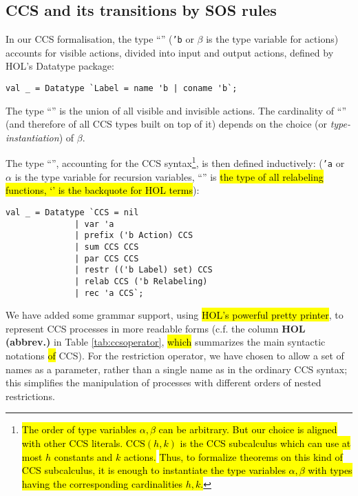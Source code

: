 
\subsection{CCS and its transitions by SOS rules}

In our CCS formalisation, the type ``'' (\texttt{'b} or
$\beta$ is the type variable for actions) accounts for visible actions, divided into input
and output actions, defined by HOL's Datatype package:
\begin{lstlisting}
val _ = Datatype `Label = name 'b | coname 'b`;
\end{lstlisting}
The type ``'' is the
union of all visible and invisible actions. The cardinality of
``'' (and therefore of all
CCS types built on top of it)
 depends on the choice (or \emph{type-instantiation}) of $\beta$.

The type ``'', accounting for the CCS
syntax\footnote{\hl{The order of type variables $\alpha, \beta$ can be
    arbitrary. But our choice is aligned with other CCS literals.
$\mathrm{CCS}(h,k)$ is the CCS subcalculus which can use at most $h$ constants
and $k$ actions.} \cite{gorrieri2017ccs} \hl{Thus, to formalize theorems on
this kind of CCS subcalculus, it is enough to instantiate the type
variables $\alpha, \beta$ with types having the corresponding cardinalities $h, k$.}}, is then defined inductively:
(\texttt{'a} or $\alpha$ is the type variable for recursion variables,
``'' is \hl{the type of all relabeling functions,
`\mbox{}' is the backquote for HOL terms}):
\begin{lstlisting}
val _ = Datatype `CCS = nil
		      | var 'a
		      | prefix ('b Action) CCS
		      | sum CCS CCS
		      | par CCS CCS
		      | restr (('b Label) set) CCS
		      | relab CCS ('b Relabeling)
		      | rec 'a CCS`;
\end{lstlisting}

We have added some grammar support,
 using \hl{HOL's powerful pretty printer}, to represent CCS
processes in more readable forms (c.f. the column \textbf{HOL (abbrev.)}
in Table \ref{tab:ccsoperator}, \hl{which} summarizes 
the main syntactic notations \hl{of} CCS). For the restriction
operator, we have chosen to allow a  set of names as a parameter, rather than a
  single name as in the ordinary  CCS syntax; this simplifies 
the manipulation of 
 processes with different orders of
  nested restrictions.

